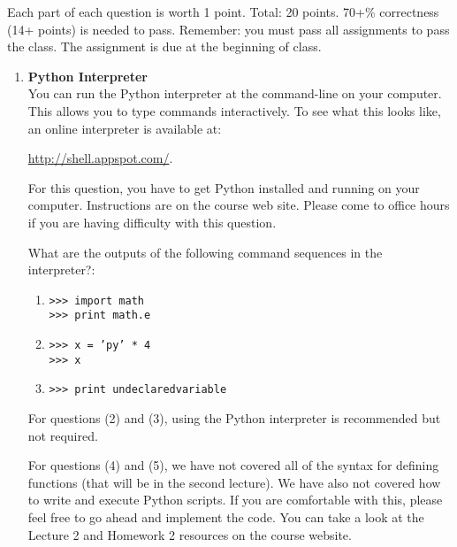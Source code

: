 \documentclass{article}
\newcounter{points}
\begin{document}
\pagestyle{fancy}

Each part of each question is worth 1 point.  Total: 20 points.  70+\% correctness (14+ points) is needed to pass.  Remember: you must pass all assignments to pass the class.  The assignment is due at the beginning of class.

\begin{enumerate}
\item \textbf{Python Interpreter} \\
You can run the Python interpreter at the command-line on your computer.  This allows you to type commands interactively.  To see what this looks like, an online interpreter is available at:
\begin{center}
\url{http://shell.appspot.com/}.
\end{center}
For this question, you have to get Python installed and running on your computer.  Instructions are on the course web site.  Please come to office hours if you are having difficulty with this question.

What are the outputs of the following command sequences in the interpreter?:

\begin{enumerate}
\item
\texttt{>>> import math} \\
\texttt{>>> print math.e}
\end{enumerate}

\begin{enumerate}
\setcounter{enumii}{1}
\item
\texttt{>>> x = 'py' * 4} \\
\texttt{>>> x}
\end{enumerate}

\begin{enumerate}
\setcounter{enumii}{2}
\item
\texttt{>>> print undeclaredvariable} \\
\end{enumerate}
For questions (2) and (3), using the Python interpreter is recommended but not required.

For questions (4) and (5), we have not covered all of the syntax for defining functions (that will be in the second lecture).  We have also not covered how to write and execute Python scripts.  If you are comfortable with this, please feel free to go ahead and implement the code.  You can take a look at the Lecture 2 and Homework 2 resources on the course website.



\end{enumerate}
\end{document}
